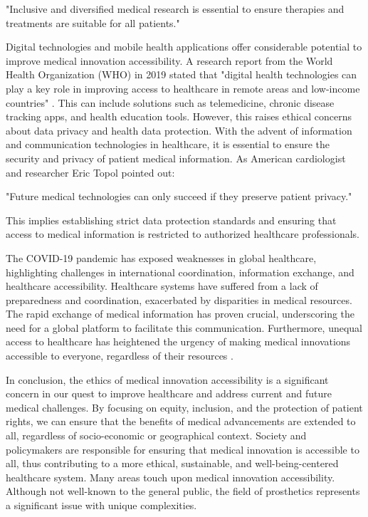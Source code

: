 "Inclusive and diversified medical research is essential to ensure therapies and treatments are suitable for all patients."

Digital technologies and mobile health applications offer considerable potential to improve medical innovation accessibility. A research report from the World Health Organization (WHO) in 2019 stated that "digital health technologies can play a key role in improving access to healthcare in remote areas and low-income countries" \cite{dia_projet_nodate}. This can include solutions such as telemedicine, chronic disease tracking apps, and health education tools. However, this raises ethical concerns about data privacy and health data protection. With the advent of information and communication technologies in healthcare, it is essential to ensure the security and privacy of patient medical information. As American cardiologist and researcher Eric Topol pointed out:

"Future medical technologies can only succeed if they preserve patient privacy."

This implies establishing strict data protection standards and ensuring that access to medical information is restricted to authorized healthcare professionals.

The COVID-19 pandemic has exposed weaknesses in global healthcare, highlighting challenges in international coordination, information exchange, and healthcare accessibility. Healthcare systems have suffered from a lack of preparedness and coordination, exacerbated by disparities in medical resources. The rapid exchange of medical information has proven crucial, underscoring the need for a global platform to facilitate this communication. Furthermore, unequal access to healthcare has heightened the urgency of making medical innovations accessible to everyone, regardless of their resources \cite{noauthor_covid-19_nodate}.

In conclusion, the ethics of medical innovation accessibility is a significant concern in our quest to improve healthcare and address current and future medical challenges. By focusing on equity, inclusion, and the protection of patient rights, we can ensure that the benefits of medical advancements are extended to all, regardless of socio-economic or geographical context. Society and policymakers are responsible for ensuring that medical innovation is accessible to all, thus contributing to a more ethical, sustainable, and well-being-centered healthcare system. Many areas touch upon medical innovation accessibility. Although not well-known to the general public, the field of prosthetics represents a significant issue with unique complexities.

